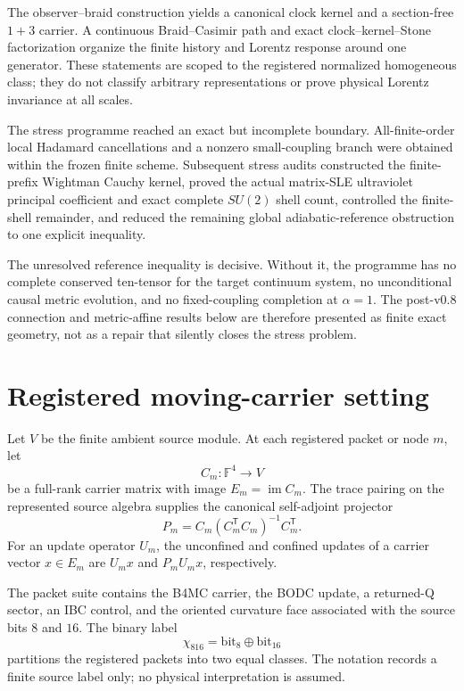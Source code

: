 \documentclass[12pt,a4paper,twoside]{article}
\newcommand{\im}{\operatorname{im}}
\newcommand{\F}{\mathbb{F}}
\begin{document}
The observer--braid construction yields a canonical clock kernel and a section-free $1+3$ carrier. A continuous Braid--Casimir path and exact clock--kernel--Stone factorization organize the finite history and Lorentz response around one generator. These statements are scoped to the registered normalized homogeneous class; they do not classify arbitrary representations or prove physical Lorentz invariance at all scales.

The stress programme reached an exact but incomplete boundary. All-finite-order local Hadamard cancellations and a nonzero small-coupling branch were obtained within the frozen finite scheme. Subsequent stress audits constructed the finite-prefix Wightman Cauchy kernel, proved the actual matrix-SLE ultraviolet principal coefficient and exact complete $SU(2)$ shell count, controlled the finite-shell remainder, and reduced the remaining global adiabatic-reference obstruction to one explicit inequality.

The unresolved reference inequality is decisive. Without it, the programme has no complete conserved ten-tensor for the target continuum system, no unconditional causal metric evolution, and no fixed-coupling completion at $\alpha=1$. The post-v0.8 connection and metric-affine results below are therefore presented as finite exact geometry, not as a repair that silently closes the stress problem.

\section{Registered moving-carrier setting}

Let $V$ be the finite ambient source module. At each registered packet or node $m$, let
\[
C_m:\F^4\longrightarrow V
\]
be a full-rank carrier matrix with image $E_m=\im C_m$. The trace pairing on the represented source algebra supplies the canonical self-adjoint projector
\begin{equation}
P_m=C_m(C_m^{\mathsf T}C_m)^{-1}C_m^{\mathsf T}.
\label{eq:projector}
\end{equation}
For an update operator $U_m$, the unconfined and confined updates of a carrier vector $x\in E_m$ are $U_mx$ and $P_mU_mx$, respectively.

The packet suite contains the B4MC carrier, the BODC update, a returned-Q sector, an IBC control, and the oriented curvature face associated with the source bits $8$ and $16$. The binary label
\begin{equation}
\chi_{816}=\mathrm{bit}_8\oplus\mathrm{bit}_{16}
\label{eq:chi}
\end{equation}
partitions the registered packets into two equal classes. The notation records a finite source label only; no physical interpretation is assumed.
\end{document}
